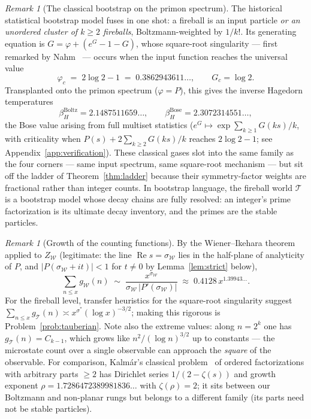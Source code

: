\documentclass[11pt]{article}
\newcommand{\cT}{\mathcal{T}}   %
\newcommand{\cW}{\mathcal{W}}   %
\numberwithin{equation}{section}
\theoremstyle{plain}
\theoremstyle{definition}
\theoremstyle{remark}
\newtheorem{remark}[theorem]{Remark}
\begin{document}
\begin{remark}[The classical bootstrap on the primon spectrum]\label{rem:bootstrap}
The historical statistical bootstrap model fuses in one shot: a fireball is an input
particle \emph{or an unordered cluster of $k \ge 2$ fireballs}, Boltzmann-weighted by
$1/k!$. Its generating equation is $G = \varphi + (e^{G} - 1 - G)$, whose square-root
singularity --- first remarked by Nahm~\cite{nahm} --- occurs when the input function
reaches the universal value
\[
\varphi_c \;=\; 2\log 2 - 1 \;=\; 0.3862943611\dots,
\qquad G_c = \log 2 .
\]
Transplanted onto the primon spectrum ($\varphi = P$), this gives the inverse Hagedorn
temperatures
\[
\beta_H^{\mathrm{Boltz}} = 2.1487511659\dots,
\qquad
\beta_H^{\mathrm{Bose}} = 2.3072314551\dots,
\]
the Bose value arising from full multiset statistics
($e^{G} \mapsto \exp\sum_{k\ge1} G(ks)/k$, with criticality when
$P(s) + 2\sum_{k \ge 2} G(ks)/k$ reaches $2\log2 - 1$; see
Appendix~\ref{app:verification}). These classical gases
slot into the same family as the four corners --- same input spectrum, same
square-root mechanism --- but sit off the ladder of Theorem~\ref{thm:ladder} because
their symmetry-factor weights are fractional rather than integer counts. In bootstrap
language, the fireball world $\cT$ is a bootstrap model whose decay chains are fully
resolved: an integer's prime factorization is its ultimate decay inventory, and the
primes are the stable particles.
\end{remark}

\begin{remark}[Growth of the counting functions]\label{rem:growth}
By the Wiener--Ikehara theorem applied to $Z_\cW$ (legitimate: the line
$\operatorname{Re} s = \sigma_\cW$ lies in the half-plane of analyticity of $P$, and
$|P(\sigma_\cW + it)| < 1$ for $t \ne 0$ by Lemma~\ref{lem:strict} below),
\[
\sum_{n \le x} g_\cW(n) \;\sim\; \frac{x^{\sigma_\cW}}{\sigma_\cW\,|P'(\sigma_\cW)|}
\;\approx\; 0.4128\, x^{1.39943\dots}.
\]
For the fireball level, transfer heuristics for the square-root singularity suggest
$\sum_{n \le x} g_\cT(n) \asymp x^{\sigma^{*}} (\log x)^{-3/2}$; making this rigorous
is Problem~\ref{prob:tauberian}. Note also the extreme values: along $n = 2^k$ one has
$g_\cT(n) = C_{k-1}$, which grows like $n^{2}/(\log n)^{3/2}$ up to constants --- the
microstate count over a single observable can approach the \emph{square} of the
observable. For comparison, Kalm\'ar's classical problem~\cite{kalmar} of ordered
factorizations with arbitrary parts $\ge 2$ has Dirichlet series $1/(2 - \zeta(s))$
and growth exponent $\rho = 1.7286472389981836\dots$ with $\zeta(\rho) = 2$; it sits
between our Boltzmann and non-planar rungs but belongs to a different family (its
parts need not be stable particles).
\end{remark}
\end{document}
